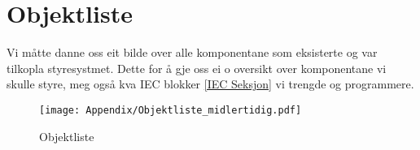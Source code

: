\section{Objektliste}
\thispagestyle{fancy}

Vi måtte danne oss eit bilde over alle komponentane som eksisterte og var tilkopla styresystmet. Dette for å gje oss ei o
oversikt over komponentane vi skulle styre, meg også kva \gls{IEC} blokker \ref{IEC Seksjon} vi trengde og programmere.

\begin{figure}[htbp]
    \centering
    \texttt{[image: Appendix/Objektliste\_midlertidig.pdf]}
    \caption{Objektliste}
    \label{fig:Objektliste}
\end{figure}

\newpage








\newpage


\newpage
